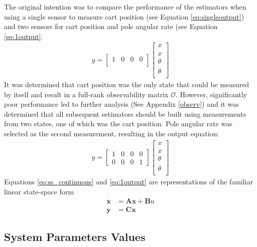 \documentclass{article}
\newcommand{\matr}[1]{\bm{#1}}     %
\begin{document}
The original intention was to compare the performance of the estimators when using a single sensor to measure cart position (see Equation \ref{eq:singleoutput}) and two sensors for cart position and pole angular rate (see Equation \ref{eq:1output}. 
 \begin{align}
 y = \begin{bmatrix}
 1 & 0 & 0 & 0 \\
 \end{bmatrix} \begin{bmatrix}
 	x \\
 	\dot{x} \\
 	\theta \\
 	\dot{\theta} \\
 \end{bmatrix}
 \label{eq:singleoutput}
 \end{align}
 It was determined that cart position was the only state that could be measured by itself and result in a full-rank observability matrix $\mathcal{O}$. However, significantly poor performance led to further analysis (See Appendix \ref{observ}) and it was determined that all subsequent estimators should be built using measurements from two states, one of which was the cart position. Pole angular rate was selected as the second measurement, resulting in the output equation:
\begin{align}
y = \begin{bmatrix}
1 & 0 & 0 & 0 \\
0 & 0 & 0 & 1
\end{bmatrix} \begin{bmatrix}
	x \\
	\dot{x} \\
	\theta \\
	\dot{\theta} \\
\end{bmatrix}
\label{eq:1output}
\end{align}
Equations \ref{eq:ss_continuous} and \ref{eq:1output} are representations of the familiar linear state-space form
\begin{equation}
\begin{aligned}
\matr{\dot{x}} &= \matr{A}\matr{x} + \matr{B}u \\
\matr{y} &= \matr{C}\matr{x}
\end{aligned}
\end{equation}

\subsection{System Parameters Values}
\end{document}
